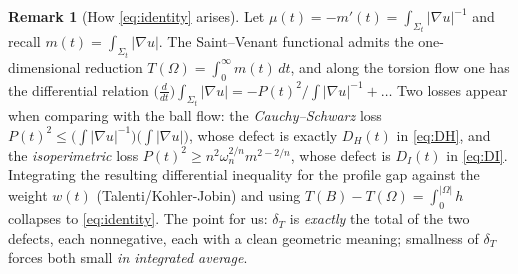 \documentclass[11pt]{amsart}
\theoremstyle{definition}
\newtheorem{remark}[theorem]{Remark}
\theoremstyle{remark}
\newcommand{\Om}{\Omega}
\newcommand{\dT}{\delta_T}
\begin{document}
\begin{remark}[How \eqref{eq:identity} arises]
Let $\mu(t)=-m'(t)=\int_{\Sigma_t}|\nabla u|^{-1}$ and recall
$m(t)=\int_{\Sigma_t}|\nabla u|$. The Saint--Venant functional admits the
one-dimensional reduction $T(\Om)=\int_0^\infty m(t)\,dt$, and along the
torsion flow one has the differential relation
$\bigl(\tfrac{d}{dt}\bigr)\!\int_{\Sigma_t}|\nabla u|=-P(t)^2/\!\int|\nabla u|^{-1}+\dots$
Two losses appear when comparing with the ball flow: the
\emph{Cauchy--Schwarz} loss
$P(t)^2\le\bigl(\int|\nabla u|^{-1}\bigr)\bigl(\int|\nabla u|\bigr)$, whose
defect is exactly $D_H(t)$ in \eqref{eq:DH}, and the \emph{isoperimetric}
loss $P(t)^2\ge n^2\omega_n^{2/n}m^{2-2/n}$, whose defect is $D_I(t)$ in
\eqref{eq:DI}. Integrating the resulting differential inequality for the
profile gap against the weight $w(t)$ (Talenti/Kohler-Jobin) and using
$T(B)-T(\Om)=\int_0^{|\Om|}h$ collapses to \eqref{eq:identity}. The point for
us: $\dT$ is \emph{exactly} the total of the two defects, each nonnegative,
each with a clean geometric meaning; smallness of $\dT$ forces both small
\emph{in integrated average}.
\end{remark}
\end{document}
